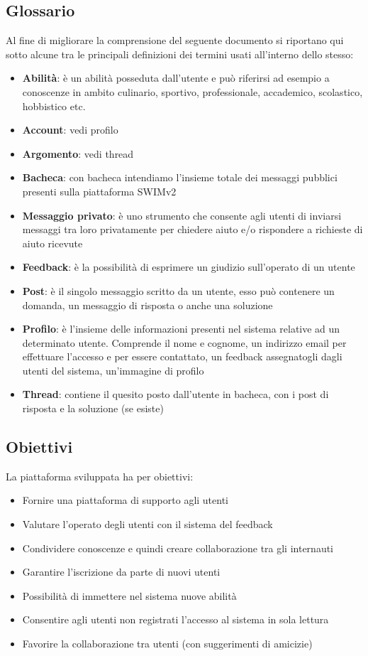 \documentclass[a4paper,12pt]{article}
\begin{document}
\subsection{Glossario}
Al fine di migliorare la comprensione del seguente documento si riportano qui sotto alcune tra le principali definizioni dei termini usati all’interno dello stesso:
\begin{itemize}
\item {\bfseries Abilità}:
è un abilità posseduta dall’utente e può riferirsi ad esempio a conoscenze in ambito culinario, sportivo, professionale, accademico, scolastico, hobbistico etc.
\item {\bfseries Account}: vedi profilo
\item {\bfseries Argomento}: vedi thread
\item {\bfseries Bacheca}:
con bacheca intendiamo l’insieme totale dei messaggi pubblici presenti sulla piattaforma SWIMv2
\item {\bfseries Messaggio privato}:
è uno strumento che consente agli utenti di inviarsi messaggi tra loro privatamente per chiedere aiuto e/o rispondere a richieste di aiuto ricevute
\item {\bfseries Feedback}:
è la possibilità di esprimere un giudizio sull’operato di un utente
\item {\bfseries Post}:
è il singolo messaggio scritto da un utente, esso può contenere un domanda, un messaggio di risposta o anche una soluzione
\item {\bfseries Profilo}:
è l’insieme delle informazioni presenti nel sistema relative ad un determinato utente. Comprende il nome e cognome, un indirizzo email per effettuare l’accesso e per essere contattato, un feedback assegnatogli dagli utenti del sistema, un’immagine di profilo
\item {\bfseries Thread}:
contiene il quesito posto dall’utente in bacheca, con i post di risposta e la soluzione (se esiste)
\end{itemize}

\clearpage

\subsection{Obiettivi}
La piattaforma sviluppata ha per obiettivi:
\begin{itemize}
\item Fornire una piattaforma di supporto agli utenti
\item Valutare l’operato degli utenti con il sistema del feedback
\item Condividere conoscenze e quindi creare collaborazione tra gli internauti
\item Garantire l’iscrizione da parte di nuovi utenti
\item Possibilità di immettere nel sistema nuove abilità
\item Consentire agli utenti non registrati l’accesso al sistema in sola lettura
\item Favorire la collaborazione tra utenti (con suggerimenti di amicizie)
\end{itemize}
\end{document}
